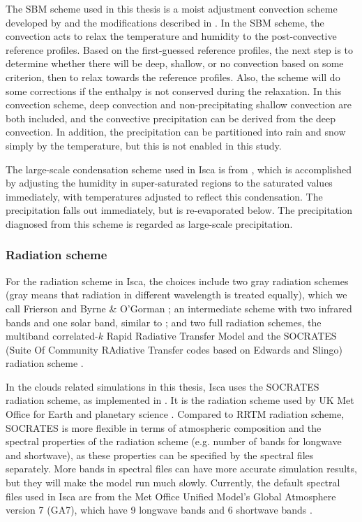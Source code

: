 The SBM scheme used in this thesis is a moist adjustment convection scheme developed by \cite{Frierson2007} and the modifications described in \cite{OGorman2008hydrological}. In the SBM scheme, the convection acts to relax the temperature and humidity to the post-convective reference profiles. Based on the first-guessed reference profiles, the next step is to determine whether there will be deep, shallow, or no convection based on some criterion, then to relax towards the reference profiles. Also, the scheme will do some corrections if the enthalpy is not conserved during the relaxation. In this convection scheme, deep convection and non-precipitating shallow convection are both included, and the convective precipitation can be derived from the deep convection. In addition, the precipitation can be partitioned into rain and snow simply by the temperature, but this is not enabled in this study.

The large-scale condensation scheme used in Isca is from \cite{Frierson2006}, which is accomplished by adjusting the humidity in super-saturated regions to the saturated values immediately, with temperatures adjusted to reflect this condensation. The precipitation falls out immediately, but is re-evaporated below. The precipitation diagnosed from this scheme is regarded as large-scale precipitation.

\subsubsection{Radiation scheme}

For the radiation scheme in Isca, the choices include two gray radiation schemes (gray means that radiation in different wavelength is treated equally), which we call Frierson \citep{Frierson2006} and Byrne \& O'Gorman \citep[BOG;][]{Byrne2013}; an intermediate scheme with two infrared bands and one solar band, similar to \cite{Geen2016}; and two full radiation schemes, the multiband correlated-$k$ Rapid Radiative Transfer Model \citep[RRTM;][]{Clough2005} and the SOCRATES (Suite Of Community RAdiative Transfer codes based on Edwards and Slingo) radiation scheme  \citep{Edwards1996, Manners2015}. 

In the clouds related simulations in this thesis, Isca uses the SOCRATES radiation scheme, as implemented in \cite{Thomson2019}. It is the radiation scheme used by UK Met Office for Earth and planetary science \citep{Manners2015}. Compared to RRTM radiation scheme, SOCRATES is more flexible in terms of atmospheric composition and the spectral properties of the radiation scheme (e.g. number of bands for longwave and shortwave), as these properties can be specified by the spectral files separately. More bands in spectral files can have more accurate simulation results, but they will make the model run much slowly. Currently, the default spectral files used in Isca are from the Met Office Unified Model's Global Atmosphere version 7 (GA7), which have 9 longwave bands and 6 shortwave bands \citep{Walters2019}.

